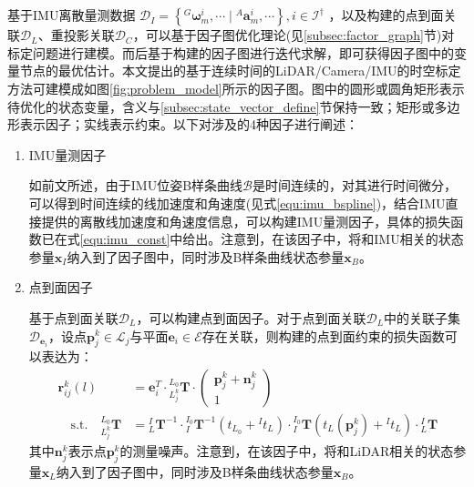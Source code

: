 \section{}
\label{sect:batch_optimization}
基于IMU离散量测数据
$\mathcal{D}_I=\left\lbrace {^{G}}\boldsymbol{\omega}_m^i,\cdots\mid{^{A}}\boldsymbol{a}_m^i,\cdots\right\rbrace,i\in\mathcal{I}^\dagger$
，以及构建的点到面关联$\mathcal{D}_{L}$、重投影关联$\mathcal{D}_{C}$，可以基于因子图优化理论(见\ref{subsec:factor_graph}节)对标定问题进行建模。而后基于构建的因子图进行迭代求解，即可获得因子图中的变量节点的最优估计。本文提出的基于连续时间的LiDAR/Camera/IMU的时空标定方法可建模成如图\ref{fig:problem_model}所示的因子图。图中的圆形或圆角矩形表示待优化的状态变量，含义与\ref{subsec:state_vector_define}节保持一致；矩形或多边形表示因子；实线表示约束。以下对涉及的4种因子进行阐述：
\begin{enumerate}
  \item IMU量测因子

        如前文所述，由于IMU位姿B样条曲线$\mathcal{B}$是时间连续的，对其进行时间微分，可以得到时间连续的线加速度和角速度(见式\ref{equ:imu_bspline})，结合IMU直接提供的离散线加速度和角速度信息，可以构建IMU量测因子，具体的损失函数已在式\ref{equ:imu_const}中给出。注意到，在该因子中，将和IMU相关的状态参量$\boldsymbol{x}_I$纳入到了因子图中，同时涉及B样条曲线状态参量$\boldsymbol{x}_B$。

  \item 点到面因子

        基于点到面关联$\mathcal{D}_{L}$，可以构建点到面因子。对于点到面关联$\mathcal{D}_{L}$中的关联子集$\mathcal{D}_{\boldsymbol{e}_i}$，设点$\boldsymbol{p}_j^k\in\mathcal{L}_j$与平面$\boldsymbol{e}_i\in\mathcal{E}$存在关联，则构建的点到面约束的损失函数可以表达为：
        \begin{equation}
          \begin{aligned}
            \boldsymbol{r}_{ij}^k(l)       & =\boldsymbol{e}_i^T\cdot{^{L_0}_{L_j^k}\boldsymbol{T}}\cdot\begin{pmatrix}
                                                                                                          \boldsymbol{p}_j^k+\boldsymbol{n}_j^k \\1
                                                                                                        \end{pmatrix}                                                                                                                      \\
            \quad\mathrm{s.t.}\quad
            {^{L_0}_{L_j^k}\boldsymbol{T}} & ={{^{I}_{L}}\boldsymbol{T}^{-1}}\cdot{{^{I_0}_{I}}\boldsymbol{T}^{-1}\left( t_{L_0}+{^{I}t_L}\right) }\cdot{{^{I_0}_{I}}\boldsymbol{T}\left( t_{L}(\boldsymbol{p}_j^k)+{^{I}t_L}\right) }\cdot{{^{I}_{L}}\boldsymbol{T}}
          \end{aligned}
        \end{equation}
        其中$\boldsymbol{n}_j^k$表示点$\boldsymbol{p}_j^k$的测量噪声。注意到，在该因子中，将和LiDAR相关的状态参量$\boldsymbol{x}_L$纳入到了因子图中，同时涉及B样条曲线状态参量$\boldsymbol{x}_B$。


\end{enumerate}
